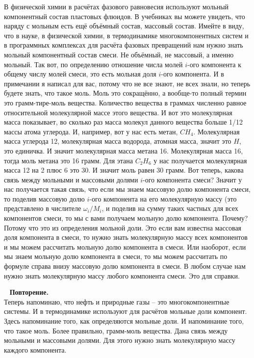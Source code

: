 \documentclass[main.tex]{subfiles}
\begin{document}
В физической химии в расчётах фазового равновесия используют мольный компонентный состав пластовых флюидов.
В учебниках вы можете увидеть, что наряду с мольным есть ещё объёмный состав, массовый состав.
Имейте в виду, что в науке, в физической химии, в термодинамике многокомпонентных систем и в программных комплексах для расчёта фазовых превращений нам нужно знать мольный компонентный состав смеси.
Не объёмный, не массовый, а именно мольный.
Так вот, по определению отношение числа молей $i$-ого компонента к общему числу молей смеси, это есть мольная доля $i$-ого компонента.
И в примечании я написал для вас, потому что не все знают, не всех знали, но теперь будете знать, что такое моль.
Моль это сокращённо, а вообще-то полный термин это грамм-тире-моль вещества.
Количество вещества в граммах численно равное относительной молекулярной массе этого вещества.
И вот это молекулярная масса показывает, во сколько раз масса молекул данного вещества больше 1/12 массы атома углерода.
И, например, вот у нас есть метан, $CH_4$.
Молекулярная масса углерода 12, молекулярная масса водорода, атомная масса, значит это $H$, это единичка.
И значит молекулярная масса метана 16.
Молекулярная масса 16, тогда моль метана это 16 грамм.
Для этана $C_2H_6$ у нас получается молекулярная масса 12 на 2 плюс 6 это 30.
И значит моль равен 30 грамм.
Вот теперь, какова связь между мольными и массовыми долями $i$-ого компонента смеси?
Значит у нас получается такая связь, что если мы знаем массовую долю компонента смеси, то поделив массовую долю $i$-ого компонента на его молекулярную массу (это представлено в числителе $\omega_i/M_i$, и поделив на сумму таких частных для всех компонентов смеси, то мы с вами получаем мольную долю компонента.
Почему?
Потому что это из определения мольной доли.
Это если вам известна массовая доля компонента в смеси, то нужно знать молекулярную массу всех компонентов и мы можем рассчитать мольную долю компонента в смеси.
Или наоборот, если мы знаем мольную долю компонента в смеси, то мы можем рассчитать по формуле справа внизу массовую долю компонента в смеси.
В любом случае нам нужно знать молекулярную массу любого компонента смеси.
Это для справки.

\ \newline
\textbf{Повторение.}\\
Теперь напоминаю, что нефть и природные газы -- это многокомпонентные системы.
И в термодинамике используют для расчётов мольные доли компонент.
Здесь напоминание того, как определяются мольные доли.
И напоминание того, что такое моль.
Более правильно, грамм-моль вещества.
Дана связь между мольными и массовыми долями.
Для этого нужно знать молекулярную массу каждого компонента.
\end{document}
